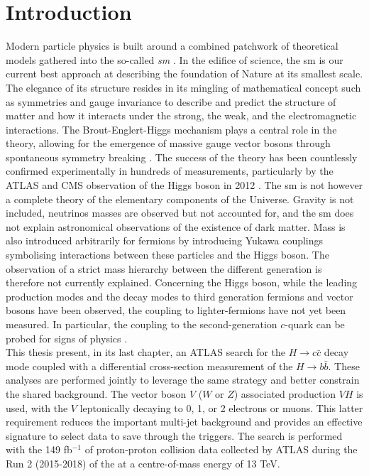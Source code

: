 \chapter{\color{oxfordblue} Introduction}
\ChapFrame

Modern particle physics is built around a combined patchwork of theoretical models gathered into the so-called \textit{\gls{sm}} \cite{Schwartz_2013, SMphysics}. In the edifice of science, the \gls{sm} is our current best approach at describing the foundation of Nature at its smallest scale. The elegance of its structure resides in its mingling of mathematical concept such as symmetries and gauge invariance to describe and predict the structure of matter and how it interacts under the strong, the weak, and the electromagnetic interactions. The Brout-Englert-Higgs mechanism plays a central role in the theory, allowing for the emergence of massive gauge vector bosons through spontaneous symmetry breaking \cite{Englert:1964et,  PhysRevLett.13.508}. The success of the theory has been countlessly confirmed experimentally in hundreds of measurements, particularly by the ATLAS and CMS observation of the Higgs boson in 2012 \cite{ATLAS:2012yve, CMS:2012qbp}. The \gls{sm} is not however a complete theory of the elementary components of the Universe. Gravity is not included, neutrinos masses are observed but not accounted for, and the \gls{sm} does not explain astronomical observations of the existence of dark matter. Mass is also introduced arbitrarily for fermions by introducing Yukawa couplings symbolising interactions between these particles and the Higgs boson. The observation of a strict mass hierarchy between the different generation is therefore not currently explained. Concerning the Higgs boson, while the leading production modes and the decay modes to third generation fermions and vector bosons have been observed, the coupling to lighter-fermions have not yet been measured. In particular, the coupling to the second-generation $c$-quark can be probed for signs of physics  \cite{PhysRevD.89.033014,PhysRevD.92.033016,Botella:2016krk,PhysRevD.98.055001,GHOSH2016504,PhysRevLett.123.031802,PhysRevD.100.115041}. \\

This thesis present, in its last chapter, an ATLAS search for the $H \rightarrow c\bar{c}$ decay mode coupled with a differential cross-section measurement of the $H \rightarrow b\bar{b}$. These analyses are performed jointly to leverage the same strategy and better constrain the shared background. The vector boson $V$ ($W$ or $Z$) associated production $VH$ is used, with the $V$ leptonically decaying to 0, 1, or 2 electrons or muons. This latter requirement reduces the important multi-jet background and provides an effective signature to select data to save through the triggers. The search is performed with the 149 fb$^{-1}$ of proton-proton collision data collected by ATLAS during the Run 2 (2015-2018) of the  at a centre-of-mass energy of 13 TeV. \\

